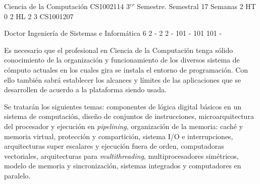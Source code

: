 \documentclass[a4paper,8pt]{article}
\begin{document}
\setNombreProfesor{}
\setGradoProfesorAbreviado{}
\sylabusHeader

\academicaTable
{Ciencia de la Computación} %
{CS1002114} %
{3$^{er}$ Semestre.} %
{Semestral} %
{17 Semanas} %
{2 HT} %
{} %
{0} %
{2 HL}  %
{2} %
{3} %
{CS1001207} %

\administrativaTable
{Doctor} %
{Ingeniería de Sistemas e Informática} %
{6} %
{2} %
{-} %
{2} %
{2} %
{-} %
{101} %
{-} %
{101} %
{101} %
{-} %


\begin{fundamentacion}
Es necesario que el profesional en Ciencia de la Computación tenga sólido  conocimiento de la organización y funcionamiento de los diversos sistema de cómputo actuales en los cuales gira se instala el entorno de programación. Con ello también sabrá establecer los alcances y límites de las aplicaciones que se desarrollen de acuerdo a la plataforma siendo usada.

Se tratarán los siguientes temas: componentes de lógica digital básicos en un sistema de computación, diseño de conjuntos de instrucciones, microarquitectura del procesador y ejecución en \textit{pipelining}, organización de la memoria: caché y memoria virtual, protección y compartición, sistema I/O e interrupciones, arquitecturas super escalares y ejecución fuera de orden, computadoras vectoriales, arquitecturas para \textit{multithreading}, multiprocesadores simétricos, modelo de memoria y sincronización, sistemas integrados y computadores en paralelo.


\end{fundamentacion}

\begin{sumilla}
\item \ARDigitallogicanddigitalsystems
\item \ARMachinelevelrepresentationofdata
\item \ARAssemblylevelmachineorganization
\item \ARFunctionalorganization
\item \ARMemorysystemorganizationandarchitecture
\item \ARInterfacingandcommunication
\item \ARMultiprocessingandalternativearchitectures
\item \ARPerformanceenhancements

\end{sumilla}
\end{document}
